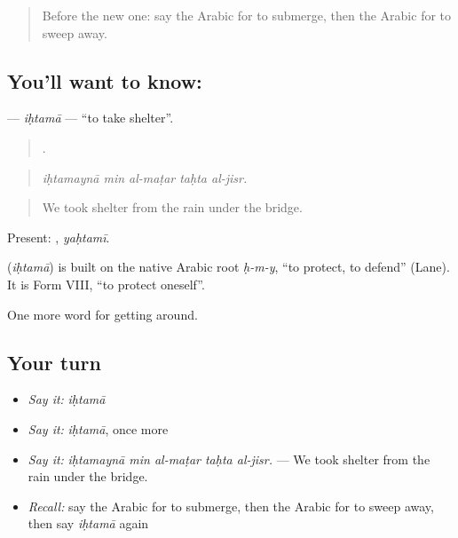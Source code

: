 \label{lesson:AR-C487-ihtama}



\begin{quote}
Before the new one: say the Arabic for to submerge, then the Arabic for to sweep away.
\end{quote}

\subsection*{You'll want to know: }
\textbf{} — \emph{iḥtamā} — \textquotedblleft{}to take shelter\textquotedblright{}.

\begin{quote}
    .
\end{quote}

\begin{quote}
\emph{iḥtamaynā min al-maṭar taḥta al-jisr.}
\end{quote}

\begin{quote}
We took shelter from the rain under the bridge.
\end{quote}

Present: , \emph{yaḥtamī}.

\begin{cousinweb}
\textbf{} (\emph{iḥtamā}) is built on the native Arabic root \emph{ḥ-m-y}, \textquotedblleft{}to protect, to defend\textquotedblright{} (Lane). It is Form VIII, \textquotedblleft{}to protect oneself\textquotedblright{}.
\end{cousinweb}

\begin{grammarlens}[title={What you've built}]
One more word for getting around.
\end{grammarlens}

\subsection*{Your turn}
\begin{itemize}
\raggedright
  \item \emph{Say it:} \emph{iḥtamā}
  \item \emph{Say it:} \emph{iḥtamā}, once more
  \item \emph{Say it:} \emph{iḥtamaynā min al-maṭar taḥta al-jisr.} — We took shelter from the rain under the bridge.
  \item \emph{Recall:} say the Arabic for to submerge, then the Arabic for to sweep away, then say \emph{iḥtamā} again
\end{itemize}


